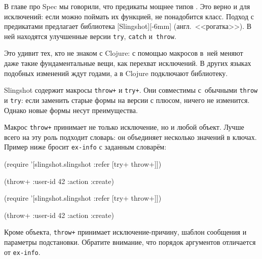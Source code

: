 
В главе про Spec мы говорили, что предикаты мощнее типов
. Это верно и для исключений: если можно поймать их
функцией, не понадобится класс. Подход с предикатами предлагает библиотека
[Slingshot][-6mm] (англ.~<<рогатка>>).
В ней находятся улучшенные версии \verb|try|, \verb|catch| и~\verb|throw|.


Это удивит тех, кто не знаком с Clojure: с помощью макросов в~ней меняют даже
такие фундаментальные вещи, как перехват исключений. В других языках подобных
изменений ждут годами, а в Clojure подключают библиотеку.


Slingshot содержит макросы \verb|throw+| и \verb|try+|. Они совместимы
с~обычными \verb|throw| и \verb|try|: если заменить старые формы на версии с
плюсом, ничего не изменится. Однако новые формы несут преимущества.

Макрос \verb|throw+| принимает не только исключение, но и любой объект. Лучше
всего на эту роль подходит словарь: он объединяет несколько значений в
ключах. Пример ниже бросит \verb|ex-info| с заданным словарём:

\ifx\DEVICETYPE\MOBILE

\begin{english}
  \begin{clojure}
(require
  '[slingshot.slingshot
    :refer [try+ throw+]])

(throw+ {:user-id 42 :action :create})
  \end{clojure}
\end{english}

\else

\begin{english}
  \begin{clojure}
(require '[slingshot.slingshot :refer [try+ throw+]])

(throw+ {:user-id 42 :action :create})
  \end{clojure}
\end{english}

\fi

Кроме объекта, \verb|throw+| принимает исключе\-ние-причину, шаблон сообщения и
параметры подстановки. Обратите внимание, что порядок аргументов отличается от
\verb|ex-info|.

\ifx\DEVICETYPE\MOBILE


